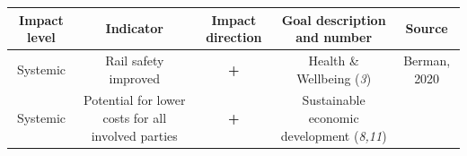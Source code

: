 \documentclass[
]{book}
\begin{document}
\begin{longtable}[]{@{}ccccc@{}}
\toprule
\begin{minipage}[b]{0.17\columnwidth}\centering
Impact level\strut
\end{minipage} & \begin{minipage}[b]{0.16\columnwidth}\centering
Indicator\strut
\end{minipage} & \begin{minipage}[b]{0.17\columnwidth}\centering
Impact direction\strut
\end{minipage} & \begin{minipage}[b]{0.17\columnwidth}\centering
Goal description and number\strut
\end{minipage} & \begin{minipage}[b]{0.17\columnwidth}\centering
Source\strut
\end{minipage}\tabularnewline
\midrule
\endhead
\begin{minipage}[t]{0.17\columnwidth}\centering
Systemic\strut
\end{minipage} & \begin{minipage}[t]{0.16\columnwidth}\centering
Rail safety improved\strut
\end{minipage} & \begin{minipage}[t]{0.17\columnwidth}\centering
\textbf{+}\strut
\end{minipage} & \begin{minipage}[t]{0.17\columnwidth}\centering
Health \& Wellbeing (\emph{3})\strut
\end{minipage} & \begin{minipage}[t]{0.17\columnwidth}\centering
Berman, 2020\strut
\end{minipage}\tabularnewline
\begin{minipage}[t]{0.17\columnwidth}\centering
Systemic\strut
\end{minipage} & \begin{minipage}[t]{0.16\columnwidth}\centering
Potential for lower costs for all involved parties\strut
\end{minipage} & \begin{minipage}[t]{0.17\columnwidth}\centering
\textbf{+}\strut
\end{minipage} & \begin{minipage}[t]{0.17\columnwidth}\centering
Sustainable economic development (\emph{8,11})\strut
\end{minipage} & \begin{minipage}[t]{0.17\columnwidth}\centering

\end{minipage}
\end{longtable}
\end{document}
